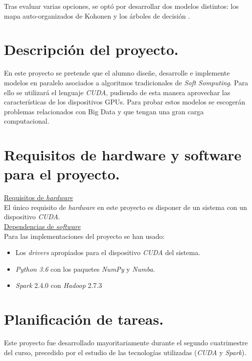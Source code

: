 \documentclass[a4paper,oneside,11pt,titlepage]{book}
\begin{document}
Tras evaluar varias opciones, se optó por desarrollar dos modelos distintos: los mapa auto-organizados de Kohonen \cite{kohonensom} y los árboles de decisión \cite{arbol}.\\

\section{Descripción del proyecto.}
En este proyecto se pretende que el alumno diseñe, desarrolle e implemente modelos en paralelo asociados a algoritmos tradicionales de \textit{Soft Somputing}. Para ello se utilizará el lenguaje \textit{CUDA}, pudiendo de esta manera aprovechar las características de los dispositivos GPUs. Para probar estos modelos se escogerán problemas relacionados con Big Data y que tengan una gran carga computacional.

\section{Requisitos de hardware y software para el proyecto.}
\underline{Requisitos de \textit{hardware}}\\
El único requisito de \textit{hardware} en este proyecto es disponer de un sistema con un dispositivo \textit{CUDA}. \\

\underline{Dependencias de \textit{software}}\\
Para las implementaciones del proyecto se han usado:
\begin{itemize}
  \item Los \textit{drivers} apropiados para el dispositivo \textit{CUDA} del sistema.
  \item \textit{Python 3.6} con los paquetes \textit{NumPy} y \textit{Numba}.
  \item \textit{Spark} 2.4.0 con \textit{Hadoop} 2.7.3
\end{itemize}

\newpage
\section{Planificación de tareas.}
Este proyecto fue desarrollado mayoritariamente durante el segundo cuatrimestre del curso, precedido por el estudio de las tecnologías utilizadas (\textit{CUDA} y \textit{Spark}).\\
\end{document}
